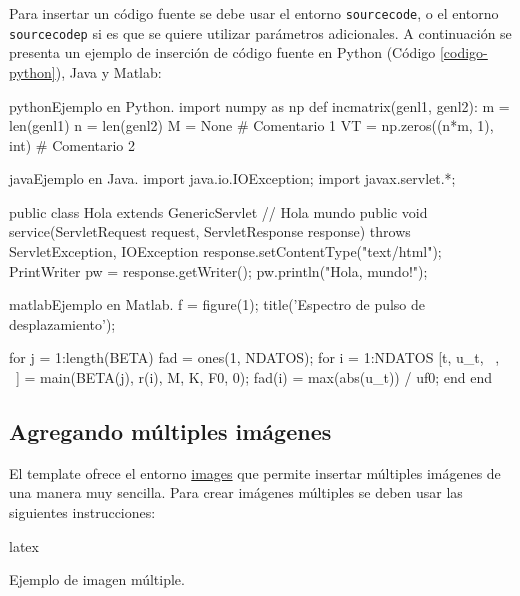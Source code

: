 	Para insertar un código fuente se debe usar el entorno \texttt{sourcecode}, o el entorno \texttt{sourcecodep} si es que se quiere utilizar parámetros adicionales. A continuación se presenta un ejemplo de inserción de código fuente en Python (Código \ref{codigo-python}), Java y Matlab:

\begin{sourcecode}[\label{codigo-python}]{python}{Ejemplo en Python.}
import numpy as np
def incmatrix(genl1, genl2):
	m = len(genl1)
	n = len(genl2)
	M = None # Comentario 1
	VT = np.zeros((n*m, 1), int) # Comentario 2
\end{sourcecode}

\begin{sourcecode}[]{java}{Ejemplo en Java.}
import java.io.IOException;
import javax.servlet.*;

public class Hola extends GenericServlet { // Hola mundo
	public void service(ServletRequest request, ServletResponse response)
	throws ServletException, IOException{
		response.setContentType("text/html");
		PrintWriter pw = response.getWriter();
		pw.println("Hola, mundo!");
	}
}
\end{sourcecode}

\begin{sourcecode}{matlab}{Ejemplo en Matlab.}
f = figure(1);
title('Espectro de pulso de desplazamiento');

for j = 1:length(BETA)
	fad = ones(1, NDATOS); %
	for i = 1:NDATOS
		[t, u_t, ~, ~] = main(BETA(j), r(i), M, K, F0, 0);
		fad(i) = max(abs(u_t)) / uf0;
	end
end
\end{sourcecode}

\subsection{Agregando múltiples imágenes}

	El template ofrece el entorno \href{https://template-latex.github.io/informe.html#hlp-images}{images} que permite insertar múltiples imágenes de una manera muy sencilla. Para crear imágenes múltiples se deben usar las siguientes instrucciones:

\begin{sourcecode}{latex}{}
\begin{images}[\label{imagenmultiple}]{Ejemplo de imagen múltiple.}
	\imagesnewline
\end{images}
\end{sourcecode}

